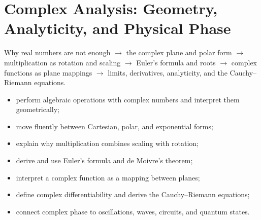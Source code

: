 \chapter{Complex Analysis: Geometry, Analyticity, and Physical Phase}
\label{chap:05-complex-analysis}

\begin{roadmapbox}
Why real numbers are not enough $\longrightarrow$ the complex plane and polar form $\longrightarrow$ multiplication as rotation and scaling $\longrightarrow$ Euler's formula and roots $\longrightarrow$ complex functions as plane mappings $\longrightarrow$ limits, derivatives, analyticity, and the Cauchy--Riemann equations.
\end{roadmapbox}

\learningobjectives
\begin{itemize}
\item perform algebraic operations with complex numbers and interpret them geometrically;
\item move fluently between Cartesian, polar, and exponential forms;
\item explain why multiplication combines scaling with rotation;
\item derive and use Euler's formula and de Moivre's theorem;
\item interpret a complex function as a mapping between planes;
\item define complex differentiability and derive the Cauchy--Riemann equations;
\item connect complex phase to oscillations, waves, circuits, and quantum states.
\end{itemize}

\newpage










